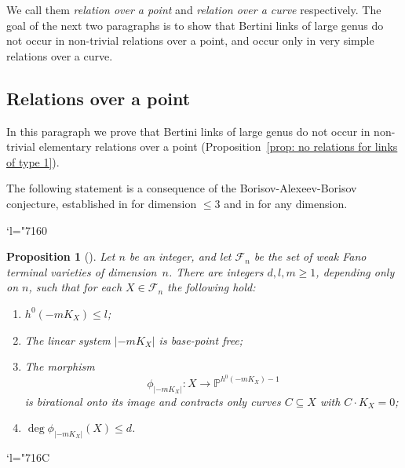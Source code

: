 \documentclass[11pt]{article}
\numberwithin{equation}{section}
\newcommand{\Changel}{\mathcode`l="7160}
\newcommand{\Changelback}{\mathcode`l="716C}
\theoremstyle{plain}
\newtheorem{prop}[thm]{Proposition}
\theoremstyle{definition}
\newcommand{\PP}{\mathbb P}
\begin{document}
We call them \emph{relation over a point} and \emph{relation over a curve} respectively. The goal of the next two paragraphs is to show that Bertini links of large genus do not occur in non-trivial relations over a point, and occur only in very simple relations over a curve.

\subsection{Relations over a point}

In this paragraph we prove that Bertini links of large genus do not occur in non-trivial elementary relations over a point (Proposition~\ref{prop: no relations for links of type 1}).

The following statement is a consequence of the Borisov-Alexeev-Borisov conjecture, established in \cite{KMMT,Kawamata} for dimension $\leqslant 3$ and in \cite{BirkarS} for any dimension.

\Changel
\begin{prop}[{\cite[Prop.\,5.1]{BLZ}}]\label{prop: BAB}
Let $n$ be an integer, and let $\mathcal{F}_n$ be the set of weak Fano terminal varieties of dimension~$n$. There are integers $d,l,m\ge 1$, depending only on $n$, such that for each $X \in \mathcal{F}_n$ the following hold:
\begin{enumerate}
\item
$h^0(-mK_X)\le l$;
\item
The linear system $\lvert -mK_X \rvert$ is base-point free;
\item
The morphism
\[
\phi_{|-mK_X|}\colon X\to \PP^{h^0(-mK_X)-1}
\]
is birational onto its image and contracts only curves $C\subseteq X$ with $C\cdot K_X=0$;
\item
$\deg \phi_{|-mK_X|}(X) \le d$.
\end{enumerate}
\end{prop}
\Changelback
\end{document}
